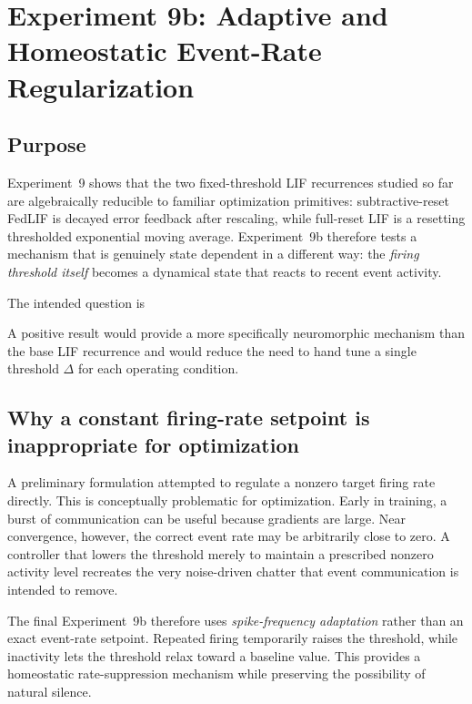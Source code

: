 \section{Experiment 9b: Adaptive and Homeostatic Event-Rate Regularization}
\label{sec:exp9b}

\subsection{Purpose}

Experiment~9 shows that the two fixed-threshold LIF recurrences studied so far are algebraically reducible to familiar optimization primitives: subtractive-reset FedLIF is decayed error feedback after rescaling, while full-reset LIF is a resetting thresholded exponential moving average. Experiment~9b therefore tests a mechanism that is genuinely state dependent in a different way: the \emph{firing threshold itself} becomes a dynamical state that reacts to recent event activity.

The intended question is
\begin{center}
\end{center}
A positive result would provide a more specifically neuromorphic mechanism than the base LIF recurrence and would reduce the need to hand tune a single threshold $\Delta$ for each operating condition.

\subsection{Why a constant firing-rate setpoint is inappropriate for optimization}

A preliminary formulation attempted to regulate a nonzero target firing rate directly. This is conceptually problematic for optimization. Early in training, a burst of communication can be useful because gradients are large. Near convergence, however, the correct event rate may be arbitrarily close to zero. A controller that lowers the threshold merely to maintain a prescribed nonzero activity level recreates the very noise-driven chatter that event communication is intended to remove.

The final Experiment~9b therefore uses \emph{spike-frequency adaptation} rather than an exact event-rate setpoint. Repeated firing temporarily raises the threshold, while inactivity lets the threshold relax toward a baseline value. This provides a homeostatic rate-suppression mechanism while preserving the possibility of natural silence.

